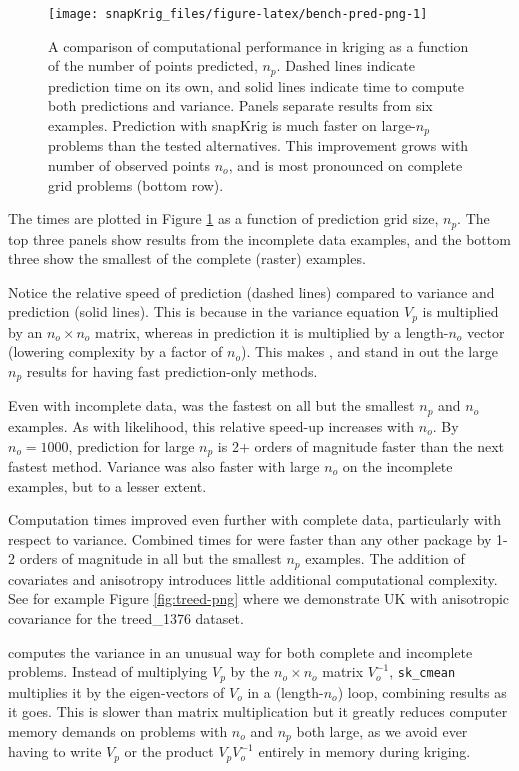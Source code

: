 \begin{figure}[!tb]
\texttt{[image: snapKrig\_files/figure-latex/bench-pred-png-1]} \caption{A comparison of computational performance in kriging as a function of the number of points predicted, $n_p$. Dashed lines indicate prediction time on its own, and solid lines indicate time to compute both predictions and variance. Panels separate results from six examples. Prediction with snapKrig is much faster on large-$n_p$ problems than the tested alternatives. This improvement grows with number of observed points $n_o$, and is most pronounced on complete grid problems (bottom row).}\label{fig:bench-pred-png}
\end{figure}

The times are plotted in Figure \ref{fig:bench-pred-png} as a function of prediction grid size, \(n_p\). The top three panels show results from the incomplete data examples, and the bottom three show the smallest of the complete (raster) examples.

Notice the relative speed of prediction (dashed lines) compared to variance and prediction (solid lines). This is because in the variance equation \(V_p\) is multiplied by an \(n_o \times n_o\) matrix, whereas in prediction it is multiplied by a length-\(n_o\) vector (lowering complexity by a factor of \(n_o\)). This makes , and  stand in out the large \(n_p\) results for having fast prediction-only methods.

Even with incomplete data,  was the fastest on all but the smallest \(n_p\) and \(n_o\) examples. As with likelihood, this relative speed-up increases with \(n_o\). By \(n_o=1000\), prediction for large \(n_p\) is 2+ orders of magnitude faster than the next fastest method. Variance was also faster with large \(n_o\) on the incomplete examples, but to a lesser extent.

Computation times improved even further with complete data, particularly with respect to variance. Combined times for  were faster than any other package by 1-2 orders of magnitude in all but the smallest \(n_p\) examples. The addition of covariates and anisotropy introduces little additional computational complexity. See for example Figure \ref{fig:treed-png} where we demonstrate UK with anisotropic covariance for the treed\_1376 dataset.

 computes the variance in an unusual way for both complete and incomplete problems. Instead of multiplying \(V_p\) by the \(n_o \times n_o\) matrix \(V_o^{-1}\), \texttt{sk\_cmean} multiplies it by the eigen-vectors of \(V_o\) in a (length-\(n_o\)) loop, combining results as it goes. This is slower than matrix multiplication but it greatly reduces computer memory demands on problems with \(n_o\) and \(n_p\) both large, as we avoid ever having to write \(V_p\) or the product \(V_p V_o^{-1}\) entirely in memory during kriging.

